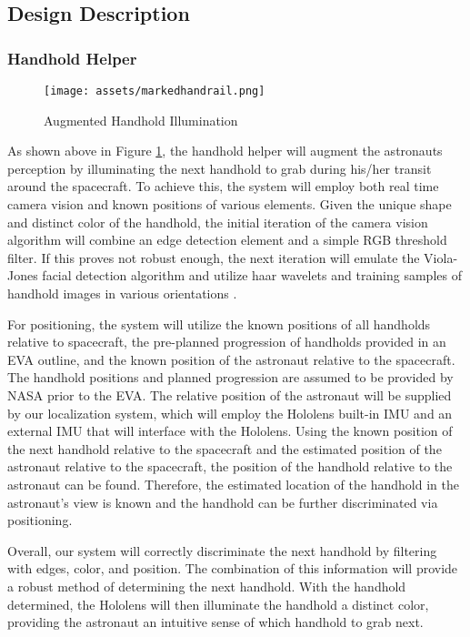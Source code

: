 \documentclass{article}
\let\Oldsubsection\subsection
\renewcommand{\subsection}{\FloatBarrier\Oldsubsection}
\let\Oldsubsubsection\subsubsection
\renewcommand{\subsubsection}{\FloatBarrier\Oldsubsubsection}
\begin{document}
\subsection{Design Description}

\subsubsection{Handhold Helper}

\begin{figure}[!htb]
  \centering
  \texttt{[image: assets/markedhandrail.png]}
  \caption{Augmented Handhold Illumination}
  \label{fig:markedhandrail}
\end{figure}

As shown above in Figure \ref{fig:markedhandrail}, the handhold helper will augment the astronauts perception by illuminating the next handhold to grab during his/her transit around the spacecraft. To achieve this, the system will employ both real time camera vision and known positions of various elements. Given the unique shape and distinct color of the handhold, the initial iteration of the camera vision algorithm will combine an edge detection element and a simple RGB threshold filter. If this proves not robust enough, the next iteration will emulate the Viola-Jones facial detection algorithm and utilize haar wavelets and training samples of handhold images in various orientations \autocite{violajones}.

For positioning, the system will utilize the known positions of all handholds relative to spacecraft, the pre-planned progression of handholds provided in an EVA outline, and the known position of the astronaut relative to the spacecraft. The handhold positions and planned progression are assumed to be provided by NASA prior to the EVA. The relative position of the astronaut will be supplied by our localization system, which will employ the Hololens built-in IMU and an external IMU that will interface with the Hololens. Using the known position of the next handhold relative to the spacecraft and the estimated position of the astronaut relative to the spacecraft, the position of the handhold relative to the astronaut can be found. Therefore, the estimated location of the handhold in the astronaut’s view is known and the handhold can be further discriminated via positioning.

Overall, our system will correctly discriminate the next handhold by filtering with edges, color, and position. The combination of this information will provide a robust method of determining the next handhold. With the handhold determined, the Hololens will then illuminate the handhold a distinct color, providing the astronaut an intuitive sense of which handhold to grab next.
\end{document}
